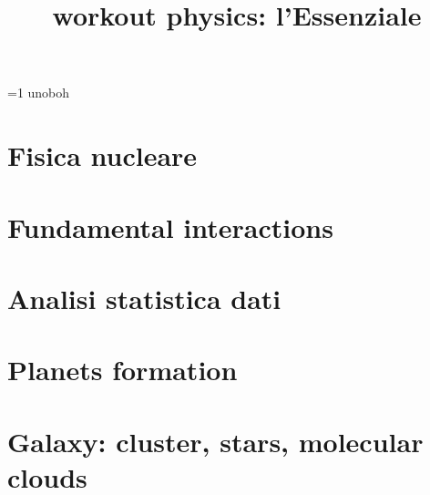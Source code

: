 \documentclass[oneside,20pt,fleqn,extrafontsizes]{memoir}
\title{workout physics: l'Essenziale}
\def\csubtoc{1}%
\begin{document}
\pagestyle{mystyle}%
\renewcommand*{\contentsname}{\label{toc}{Table of Contents}}%
\maketitle
\ifnum\csubtoc=1 uno\else boh\fi
\listoftodos
\tableofcontents*

\part{Fisica nucleare}

%

\part{Fundamental interactions}\label{intfon}




\part{Analisi statistica dati}\label{asd}




\part{Planets formation}\label{ppd}


\part{Galaxy: cluster, stars, molecular clouds}\label{stars}



\stopcontents[chapters]
\end{document}
